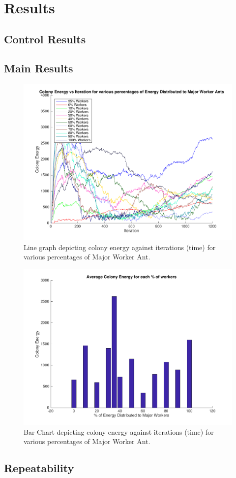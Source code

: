 \section{Results}
\subsection{Control Results}

\subsection{Main Results}

\begin{figure}[H]
  \centering
  \includegraphics[width=1\textwidth]{images/line-graph-results.png}
  \caption{Line graph depicting colony energy against iterations (time) for various percentages of Major Worker Ant.}
  \label{fig:iters-line}
\end{figure}

\begin{figure}[H]
  \centering
  \includegraphics[width=1\textwidth]{images/bar-chart-results.png}
  \caption{Bar Chart depicting colony energy against iterations (time) for various percentages of Major Worker Ant.}
  \label{fig:iters-bar}
\end{figure}

\subsection{Repeatability}

